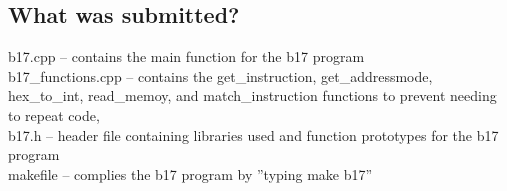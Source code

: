 \documentclass[11pt]{article}
\begin{document}
\subsection{What was submitted?}
b17.cpp – contains the main function for the b17 program\\
b17\_functions.cpp – contains the get\_instruction, get\_addressmode, hex\_to\_int, read\_memoy, and match\_instruction functions to prevent needing to repeat code,\\
b17.h – header file containing libraries used and function prototypes for the b17 program\\
makefile – complies the b17 program by ''typing make b17''
\end{document}
